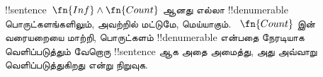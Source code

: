\documentclass[../../../include/open-logic-section]{subfiles}
\begin{document}
\begin{prob}
!!{sentence}~$\fn{Inf} \land \fn{Count}$ ஆனது எல்லா
!!{denumerable} பொருட்களங்களிலும், அவற்றில் மட்டுமே, மெய்யாகும்.
~$\fn{Count}$ இன் வரையறையை மாற்றி, பொருட்களம் !!{denumerable}
என்பதை நேரடியாக வெளிப்படுத்தும் வேறொரு !!{sentence} ஆக அதை
அமைத்து, அது அவ்வாறு வெளிப்படுத்துகிறது என்று நிறுவுக.
\end{prob}
\end{document}
